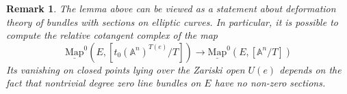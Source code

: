 \documentclass[11pt,letterpaper]{amsart}
\newtheorem{example}[dummy]{Example}
\newtheorem{remark}[dummy]{Remark}
\newcommand{\bA}{\mathbb{A}}
\newcommand{\bG}{\mathbb{G}}
\newcommand{\bP}{\mathbb{P}}
\newcommand{\Mapo}[2]{\underline{\mathrm{Map}}^{0}\left (#1,#2\right )}
\begin{document}
\begin{remark}
The lemma above can be viewed as a statement about deformation theory of bundles with sections on elliptic curves. In particular, it is possible to compute the relative cotangent complex of the map $$\Mapo{E}{[t_0 (\bA^{n})^{T(e)}/T]}\rightarrow\Mapo{E}{[\bA^n/T]}$$ Its vanishing on closed points lying over the Zariski open $U(e)$ depends on the fact that nontrivial degree zero line bundles on $E$ have no non-zero sections.
\end{remark}

 
 
\end{document}
